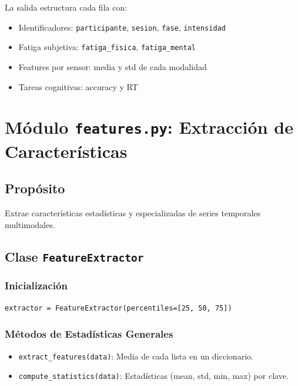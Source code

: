 \documentclass[12pt,a4paper]{article}
\begin{document}
La salida estructura cada fila con:
\begin{itemize}
    \item Identificadores: \texttt{participante}, \texttt{sesion}, \texttt{fase}, \texttt{intensidad}
    \item Fatiga subjetiva: \texttt{fatiga\_fisica}, \texttt{fatiga\_mental}
    \item Features por sensor: media y std de cada modalidad
    \item Tareas cognitivas: accuracy y RT
\end{itemize}

\section{Módulo \texttt{features.py}: Extracción de Características}

\subsection{Propósito}

Extrae características estadísticas y especializadas de series temporales multimodales.

\subsection{Clase \texttt{FeatureExtractor}}

\subsubsection{Inicialización}

\begin{lstlisting}
extractor = FeatureExtractor(percentiles=[25, 50, 75])
\end{lstlisting}

\subsubsection{Métodos de Estadísticas Generales}

\begin{itemize}
    \item \texttt{extract\_features(data)}: Media de cada lista en un diccionario.
    \item \texttt{compute\_statistics(data)}: Estadísticas (mean, std, min, max) por clave.
\end{itemize}
\end{document}
